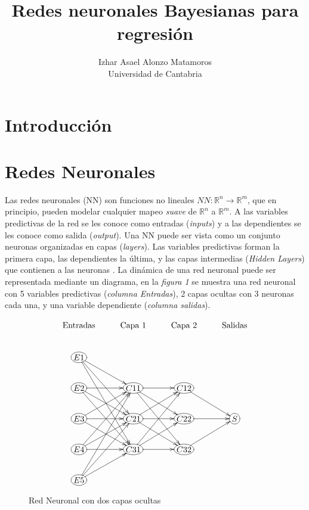 \documentclass[nojss]{jss}
\author{Izhar Asael Alonzo Matamoros \\  Universidad de Cantabria \\}
\title{\huge Redes neuronales Bayesianas para regresión}
\begin{document}
\section{Introducción}

  
\newpage
\section{Redes Neuronales}

Las redes neuronales (NN) son funciones no lineales $NN:\mathbb{R}^n \rightarrow \mathbb{R}^m$, que en principio, pueden modelar cualquier mapeo \textit{suave} de  $\mathbb{R}^n$ a $\mathbb{R}^m$. A las variables predictivas de la red se les conoce como entradas (\textit{inputs}) y a las  dependientes se les conoce como salida (\textit{output}). Una NN puede ser vista como un conjunto neuronas organizadas en capas (\textit{layers}). Las variables predictivas forman la primera capa, las dependientes la  última, y las capas intermedias (\textit{Hidden Layers}) que contienen a las neuronas \cite{Paige2001}. La dinámica de una red neuronal puede ser representada mediante un diagrama, en la \textit{figura 1} se muestra una red neuronal con 5 variables predictivas (\textit{columna Entradas}), 2 capas ocultas con 3 neuronas cada una, y una variable dependiente (\textit{columna salidas}).

\begin{figure}[H]
\centering
$$
\xymatrix{
	\text{Entradas}                     &  \text{Capa 1}                   & \text{Capa 2}      &\text{Salidas}\\
	*+[o][F]{E1}\ar[dr]\ar[ddr]\ar[dddr]&                                  &                    & \\
	*+[o][F]{E2}\ar[r] \ar[dr] \ar[ddr] &*+[o][F]{C11}\ar[r]\ar[dr]\ar[ddr]&*+[o][F]{C12}\ar[dr]& \\
	*+[o][F]{E3}\ar[dr]\ar[ur] \ar[r]   &*+[o][F]{C21}\ar[r]\ar[ur]\ar[dr] &*+[o][F]{C22}\ar[r] & *+[o][F]{S}\\
	*+[o][F]{E4}\ar[r] \ar[ur] \ar[uur] &*+[o][F]{C31}\ar[ur]\ar[r]\ar[uur]&*+[o][F]{C32}\ar[ur]& \\	
	*+[o][F]{E5}\ar[ur]\ar[uur]\ar[uuur]&                                  &                    & \\		
}
$$
\caption[Red Neuronal]{Red Neuronal con dos capas ocultas}
\label{fig:fig1}
\end{figure}
\end{document}
